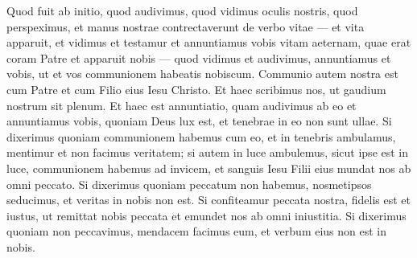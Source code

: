 \begin{biblechapter}
 \verse Quod fuit ab initio, quod audivimus, quod vidimus oculis nostris, quod perspeximus, et manus nostrae contrectaverunt de verbo vitae 
\verse — et vita apparuit, et vidimus et testamur et annuntiamus vobis vitam aeternam, quae erat coram Patre et apparuit nobis — 
\verse quod vidimus et audivimus, annuntiamus et vobis, ut et vos communionem habeatis nobiscum. Communio autem nostra est cum Patre et cum Filio eius Iesu Christo. 
\verse Et haec scribimus nos, ut gaudium nostrum sit plenum. 
 \verse Et haec est annuntiatio, quam audivimus ab eo et annuntiamus vobis, quoniam Deus lux est, et tenebrae in eo non sunt ullae.
 \verse Si dixerimus quoniam communionem habemus cum eo, et in tenebris ambulamus, mentimur et non facimus veritatem; 
\verse si autem in luce ambulemus, sicut ipse est in luce, communionem habemus ad invicem, et sanguis Iesu Filii eius mundat nos ab omni peccato.
 \verse Si dixerimus quoniam peccatum non habemus, nosmetipsos seducimus, et veritas in nobis non est. 
\verse Si confiteamur peccata nostra, fidelis est et iustus, ut remittat nobis peccata et emundet nos ab omni iniustitia. 
\verse Si dixerimus quoniam non peccavimus, mendacem facimus eum, et verbum eius non est in nobis.
 

\end{biblechapter}
